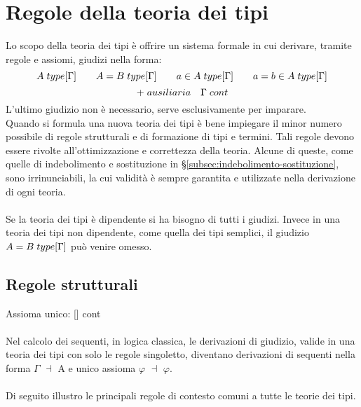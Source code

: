 \documentclass[10pt,a4paper, italian]{book}
\begin{document}
\chapter{Regole della teoria dei tipi}
\label{cap:regole-teoria-dei-tipi}
Lo scopo della teoria dei tipi \`e offrire un sistema formale in cui derivare, tramite regole e assiomi, giudizi nella forma:
\[ A \hspace{0.1cm} type[\Gamma] \qquad
A = B \hspace{0.1cm} type[\Gamma] \qquad
a \in A\hspace{0.1cm} type[\Gamma] \qquad
a=b \in A \hspace{0.1cm} type [\Gamma]
\]
\[
+ \hspace{0.1cm} ausiliaria \quad \Gamma \hspace{0.1cm} cont
\]
L'ultimo giudizio non \`e necessario, serve esclusivamente per imparare.\\
Quando si formula una nuova teoria dei tipi \`e bene impiegare il minor numero possibile di regole strutturali e di formazione di tipi e termini. Tali regole devono essere rivolte all'ottimizzazione e correttezza della teoria. Alcune di queste, come quelle di indebolimento e sostituzione in \S\ref{subsec:indebolimento-sostituzione}, sono irrinunciabili, la cui validit\`a \`e sempre garantita e utilizzate nella derivazione di ogni teoria.\\\\
Se la teoria dei tipi \`e dipendente si ha bisogno di tutti i giudizi. Invece in una teoria dei tipi non dipendente, come quella dei tipi semplici, il giudizio $A = B \hspace{0.1cm} type[\Gamma]$ pu\`o venire omesso.\\

\section{Regole strutturali}
\label{sec:regole-strutturali}
Assioma unico: [\hspace{0.1cm}] cont\\\\
Nel calcolo dei sequenti, in logica classica, le derivazioni di giudizio, valide in una teoria dei tipi con solo le regole singoletto, diventano derivazioni di sequenti nella forma $\Gamma$ $\dashv$ A e unico assioma $\varphi$ $\dashv$ $\varphi$.
\\\\
Di seguito illustro le principali regole di contesto comuni a tutte le teorie dei tipi.
\end{document}

